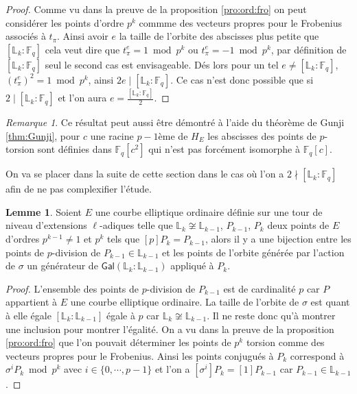 \documentclass[10pt,a4paper]{book}
\theoremstyle{plain}
\theoremstyle{definition}
\newtheorem{lem}[thm]{Lemme}
\theoremstyle{definition}
\theoremstyle{definition}
\theoremstyle{definition}
\theoremstyle{remark}
\newtheorem{rem}[thm]{Remarque}
\theoremstyle{remark}
\theoremstyle{definition}
\begin{document}
\begin{proof}
Comme vu dans la preuve de la proposition \ref{pro:ord:fro} on peut considérer les points d'ordre $p^k$ commme des vecteurs propres pour le Frobenius associés à $t_{\pi}$. Ainsi avoir $e$ la taille de l'orbite des abscisses plus petite que  $[\mathbb{L}_k:\mathbb{F}_q]$ cela veut dire que $t_{\pi}^e=1 \bmod p^k$ ou $t_{\pi}^e=-1 \bmod p^k$, par définition de $[\mathbb{L}_k:\mathbb{F}_q]$ seul le second cas est envisageable. Dés lors pour un tel $e \neq [\mathbb{L}_k:\mathbb{F}_q]$,  $(t_{\pi}^{e})^2=1 \bmod p^k$, ainsi $2e \mid [\mathbb{L}_k:\mathbb{F}_q]$. Ce cas n'est donc possible que si $2 \mid [\mathbb{L}_k:\mathbb{F}_q]$ et l'on aura $e= \frac{[\mathbb{L}_k:\mathbb{F}_q]}{2}$. 
\end{proof}


\begin{rem}
Ce résultat peut aussi être démontré à l'aide du théorème de Gunji \ref{thm:Gunji}, pour $c$ une racine $p-1$ème de $H_E$ les abscisses des points de $p$-torsion sont définies dans $\mathbb{F}_q[c^2]$ qui n'est pas forcément isomorphe à $\mathbb{F}_q[c]$.
\end{rem}

On va se placer dans la suite de cette section dans le cas où l'on a $2 \nmid [\mathbb{L}_k:\mathbb{F}_q]$ afin de ne pas complexifier l'étude.

\begin{lem}
\label{lem:bij:ord}
Soient $E$ une courbe elliptique ordinaire définie sur une tour de niveau d'extensions $\ell$-adiques telle que $\mathbb{L}_k \not \cong \mathbb{L}_{k-1}$, $P_{k-1}$, $P_k$ deux points de $E$ d'ordres $p^{k-1} \neq 1$ et $p^{k}$ tels que $[p]P_{k}=P_{k-1}$, alors il y a une bijection entre les points de $p$-division de $P_{k-1} \in \mathbb{L}_{k-1}$ et les points de l'orbite générée par l'action de $\sigma $ un générateur de $ \mathsf{Gal}(\mathbb{L}_k:\mathbb{L}_{k-1})$ appliqué à $P_{k}$.
\end{lem}

\begin{proof}
L'ensemble des points de $p$-division de $P_{k-1}$ est de cardinalité $p$ car $P$ appartient à $E$ une courbe elliptique ordinaire. La taille de l'orbite de $\sigma$ est quant à elle égale $[\mathbb{L}_k:\mathbb{L}_{k-1}]$ égale à $p$ car $\mathbb{L}_k \not \cong \mathbb{L}_{k-1}$. Il ne reste donc qu'à montrer une inclusion pour montrer l'égalité. On a vu dans la preuve de la proposition \ref{pro:ord:fro} que l'on pouvait déterminer les points de $p^k$ torsion comme des vecteurs propres pour le Frobenius. Ainsi les points conjugués à $P_k$ correspond à$\sigma^{i } P_{k} \bmod p^k$ avec $i \in \{0, \cdots , p-1  \}$ et l'on a $[\sigma^{i}]P_{k}=[1]P_{k-1}$ car $P_{k-1} \in \mathbb{L}_{k-1}$.
\end{proof}
\end{document}
